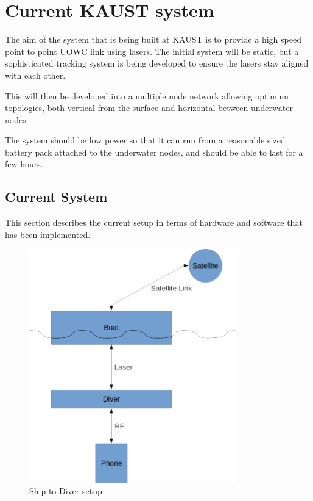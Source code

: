 \section{Current \ac{KAUST} system}
The aim of the system that is being built at \ac{KAUST} is to provide a high
speed point to point \ac{UOWC} link using lasers. The initial system will be
static, but a sophisticated tracking system is being developed to ensure the
lasers stay aligned with each other.

This will then be developed into a multiple node network allowing optimum
topologies, both vertical from the surface and horizontal between underwater
nodes.

The system should be low power so that it can run from a reasonable sized
battery pack attached to the underwater nodes, and should be able to last for
a few hours.

\subsection{Current System}
This section describes the current setup in terms of hardware and software
that has been implemented.

\begin{figure}[H]
  \includegraphics[width=0.8\textwidth]{ship_to_diver.png}
  \caption{Ship to Diver setup}
  \label{fig:ship-to-diver}
\end{figure}

